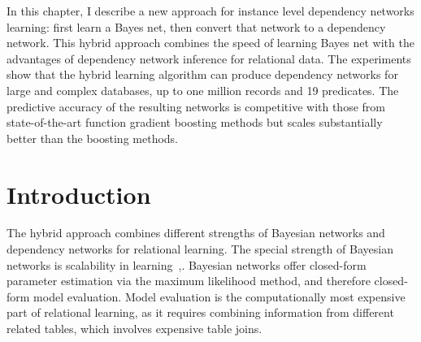 \documentclass{sfuthesis}
\begin{document}
In this chapter, I describe a new approach for instance level dependency networks learning: first learn a Bayes net, then convert that network to a dependency network. This hybrid approach combines the speed of learning Bayes net with the advantages of dependency network inference for relational data. The experiments show that the hybrid learning algorithm can produce dependency networks for large and complex databases, up to one million records and 19 predicates. The predictive accuracy of the resulting networks is competitive with those from state-of-the-art function gradient boosting methods
but scales substantially better than the boosting methods.
%
\section{Introduction}
The hybrid approach combines different strengths of Bayesian networks and dependency networks for relational learning. The special strength of Bayesian networks is scalability in learning~\cite[Sec.8.5.1]{Neville2007},\cite{Khosravi2010}. Bayesian networks offer closed-form parameter estimation via the maximum likelihood method, and therefore closed-form model evaluation. Model evaluation is the computationally most expensive part of relational learning, as it requires combining information from different related tables, which involves expensive table joins. 
\end{document}
